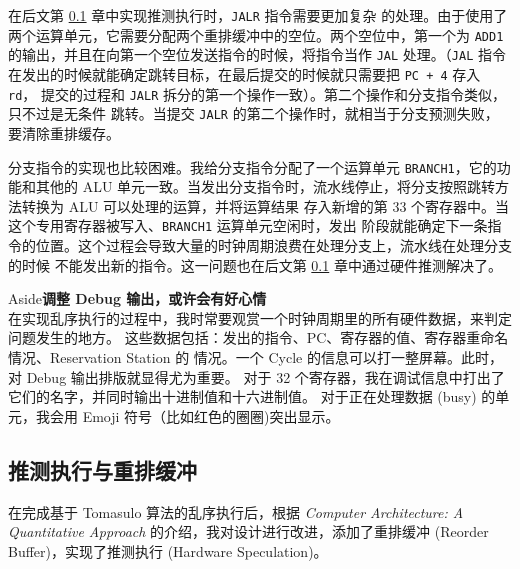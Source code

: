 \documentclass[12pt]{article}
\newenvironment{aside}[1]
    { \begin{tcolorbox}[enlarge top by=0.5cm, enlarge bottom by=0.5cm] Aside\space\space\space\space \textbf{#1} \\
        } { \end{tcolorbox} }
\begin{document}
    在后文第 \ref{hardware-speculation} 章中实现推测执行时，\texttt{JALR} 指令需要更加复杂
    的处理。由于使用了两个运算单元，它需要分配两个重排缓冲中的空位。两个空位中，第一个为 \texttt{ADD1}
    的输出，并且在向第一个空位发送指令的时候，将指令当作 \texttt{JAL} 处理。（\texttt{JAL} 指令
    在发出的时候就能确定跳转目标，在最后提交的时候就只需要把 \texttt{PC + 4} 存入 \texttt{rd}，
    提交的过程和 \texttt{JALR} 拆分的第一个操作一致）。第二个操作和分支指令类似，只不过是无条件
    跳转。当提交 \texttt{JALR} 的第二个操作时，就相当于分支预测失败，要清除重排缓存。
    
    分支指令的实现也比较困难。我给分支指令分配了一个运算单元 \texttt{BRANCH1}，它的功能和其他的 ALU
    单元一致。当发出分支指令时，流水线停止，将分支按照跳转方法转换为 ALU 可以处理的运算，并将运算结果
    存入新增的第 33 个寄存器中。当这个专用寄存器被写入、\texttt{BRANCH1} 运算单元空闲时，发出
    阶段就能确定下一条指令的位置。这个过程会导致大量的时钟周期浪费在处理分支上，流水线在处理分支的时候
    不能发出新的指令。这一问题也在后文第 \ref{hardware-speculation} 章中通过硬件推测解决了。


    \begin{aside}{调整 Debug 输出，或许会有好心情}
        在实现乱序执行的过程中，我时常要观赏一个时钟周期里的所有硬件数据，来判定问题发生的地方。
        这些数据包括：发出的指令、PC、寄存器的值、寄存器重命名情况、Reservation Station 的
        情况。一个 Cycle 的信息可以打一整屏幕。此时，对 Debug 输出排版就显得尤为重要。
        对于 32 个寄存器，我在调试信息中打出了它们的名字，并同时输出十进制值和十六进制值。
        对于正在处理数据 (busy) 的单元，我会用 Emoji 符号（比如红色的圈圈)突出显示。
    \end{aside}

    \subsection{推测执行与重排缓冲}\label{hardware-speculation}

    在完成基于 Tomasulo 算法的乱序执行后，根据 \emph{Computer Architecture: A Quantitative Approach}
    的介绍，我对设计进行改进，添加了重排缓冲 (Reorder Buffer)，实现了推测执行 
    (Hardware Speculation)。
\end{document}
